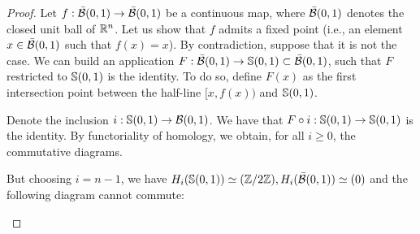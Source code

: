 \begin{proof}
    Let $f : \bar{\mathcal{B}}(0,1) \to \bar{\mathcal{B}}(0,1)$ be a continuous map, where
    $\bar{\mathcal{B}}(0,1)$ denotes the closed unit ball of $\mathbb{R}^n$. Let us show that
    $f$ admits a fixed point (i.e., an element $x \in \bar{\mathcal{B}}(0, 1)$ such
    that $f(x) = x$). By contradiction, suppose that it is not the case. We
    can build an application $F : \bar{\mathcal{B}}(0,1) \to \mathbb{S}(0, 1) \subset  \bar{\mathcal{B}}(0,1)$, such that
    $F$ restricted to $\mathbb{S}(0, 1)$ is the identity. To do so, define $F(x)$ as
    the first intersection point between the half-line $[x, f(x))$ and
    $\mathbb{S}(0, 1)$. 
    
    Denote the inclusion $i: \mathbb{S}(0, 1) \to \mathcal{B}(0, 1)$. We
    have that $F \circ i: \mathbb{S}(0, 1) \to \mathbb{S}(0, 1)$ is the identity. By
    functoriality of homology, we obtain, for all $i \ge 0$, the commutative
    diagrams. 

    \begin{figure}[H]
        \begin{center}
        \end{center}
    \end{figure}

But choosing $i = n - 1$, we have $H_i(\mathbb{S}(0, 1)) \simeq (\mathbb{Z}/2\mathbb{Z}),
H_i(\bar{\mathcal{B}}(0, 1)) \simeq (0)$ and the following diagram cannot commute:

\begin{figure}[H]
    \begin{center}
    \end{center}
\end{figure}

\end{proof}

\noindent\linia
